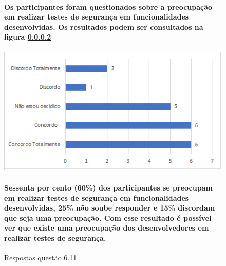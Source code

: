 \begin{figure}[!t]
\centering
\paragraph{Os participantes foram questionados sobre a preocupação em realizar testes de segurança em funcionalidades desenvolvidas. Os resultados podem ser consultados na figura \ref{fig:6.11}}
\includegraphics[scale=0.7]{figuras das questoes/6.11.png}
\caption{Respostas questão 6.11}
\paragraph{Sessenta por cento (60{\%}) dos participantes se preocupam em realizar testes de segurança em funcionalidades desenvolvidas, 25{\%} não soube responder e 15{\%} discordam que seja uma preocupação. Com esse resultado é possível ver que existe uma preocupação dos desenvolvedores em realizar testes de segurança.}
\label{fig:6.11}
\end{figure}
